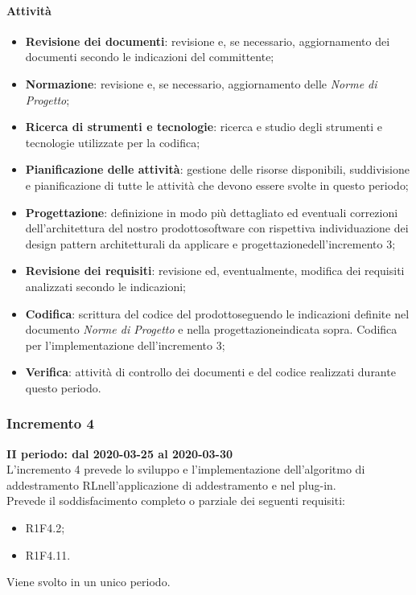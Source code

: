 \paragraph{Attività} 
\begin{itemize}
	\item \textbf{Revisione dei documenti}: revisione e, se necessario, aggiornamento dei documenti secondo le indicazioni del committente;
	\item \textbf{Normazione}: revisione e, se necessario, aggiornamento delle \textit{Norme di Progetto};
	\item \textbf{Ricerca di strumenti e tecnologie}: ricerca e studio degli strumenti e tecnologie utilizzate per la codifica;
	\item \textbf{Pianificazione delle attività}: gestione delle risorse disponibili, suddivisione e pianificazione di tutte le attività che devono essere svolte in questo periodo;
	\item \textbf{Progettazione}\glo: definizione in modo più dettagliato ed eventuali correzioni dell'architettura del nostro prodotto\glosp software con rispettiva individuazione dei design pattern architetturali da applicare e progettazione\glosp dell'incremento 3; 
	\item \textbf{Revisione dei requisiti}: revisione ed, eventualmente, modifica dei requisiti analizzati secondo le indicazioni; 
	\item \textbf{Codifica}: scrittura del codice del prodotto\glosp seguendo le indicazioni definite nel documento \textit{Norme di Progetto} e nella progettazione\glosp indicata sopra. Codifica per l'implementazione dell'incremento 3; 
	\item \textbf{Verifica}: attività di controllo dei documenti e del codice realizzati durante questo periodo.
\end{itemize}
\subsubsection{Incremento 4}
\textbf{II periodo: dal 2020-03-25 al 2020-03-30} \\
L'incremento 4 prevede lo sviluppo e l'implementazione dell'algoritmo di addestramento RL\glosp nell'applicazione di addestramento e nel plug-in.
\\Prevede il soddisfacimento completo o parziale dei seguenti requisiti:
\begin{itemize}
	\item R1F4.2;
	\item R1F4.11. 
\end{itemize}
Viene svolto in un unico periodo.
